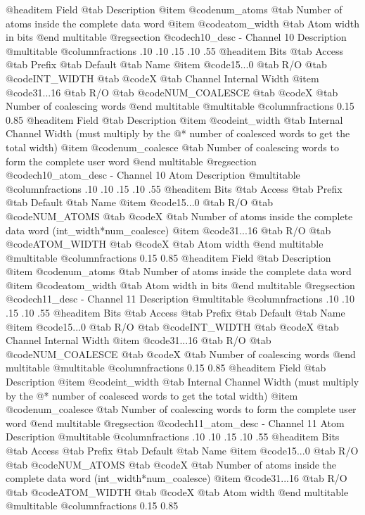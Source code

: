 @headitem Field @tab Description
@item @code{num_atoms} @tab Number of atoms inside the complete data word
@item @code{atom_width} @tab Atom width in bits
@end multitable
@regsection @code{ch10_desc} - Channel 10 Description
@multitable @columnfractions .10 .10 .15 .10 .55
@headitem Bits @tab Access @tab Prefix @tab Default @tab Name
@item @code{15...0}
@tab R/O @tab
@code{INT_WIDTH}
@tab @code{X} @tab 
Channel Internal Width
@item @code{31...16}
@tab R/O @tab
@code{NUM_COALESCE}
@tab @code{X} @tab 
Number of coalescing words
@end multitable
@multitable @columnfractions 0.15 0.85
@headitem Field @tab Description
@item @code{int_width} @tab Internal Channel Width (must multiply by the @* number of coalesced words to get the total width)
@item @code{num_coalesce} @tab Number of coalescing words to form the complete user word
@end multitable
@regsection @code{ch10_atom_desc} - Channel 10 Atom Description
@multitable @columnfractions .10 .10 .15 .10 .55
@headitem Bits @tab Access @tab Prefix @tab Default @tab Name
@item @code{15...0}
@tab R/O @tab
@code{NUM_ATOMS}
@tab @code{X} @tab 
Number of atoms inside the complete data word (int_width*num_coalesce)
@item @code{31...16}
@tab R/O @tab
@code{ATOM_WIDTH}
@tab @code{X} @tab 
Atom width
@end multitable
@multitable @columnfractions 0.15 0.85
@headitem Field @tab Description
@item @code{num_atoms} @tab Number of atoms inside the complete data word
@item @code{atom_width} @tab Atom width in bits
@end multitable
@regsection @code{ch11_desc} - Channel 11 Description
@multitable @columnfractions .10 .10 .15 .10 .55
@headitem Bits @tab Access @tab Prefix @tab Default @tab Name
@item @code{15...0}
@tab R/O @tab
@code{INT_WIDTH}
@tab @code{X} @tab 
Channel Internal Width
@item @code{31...16}
@tab R/O @tab
@code{NUM_COALESCE}
@tab @code{X} @tab 
Number of coalescing words
@end multitable
@multitable @columnfractions 0.15 0.85
@headitem Field @tab Description
@item @code{int_width} @tab Internal Channel Width (must multiply by the @* number of coalesced words to get the total width)
@item @code{num_coalesce} @tab Number of coalescing words to form the complete user word
@end multitable
@regsection @code{ch11_atom_desc} - Channel 11 Atom Description
@multitable @columnfractions .10 .10 .15 .10 .55
@headitem Bits @tab Access @tab Prefix @tab Default @tab Name
@item @code{15...0}
@tab R/O @tab
@code{NUM_ATOMS}
@tab @code{X} @tab 
Number of atoms inside the complete data word (int_width*num_coalesce)
@item @code{31...16}
@tab R/O @tab
@code{ATOM_WIDTH}
@tab @code{X} @tab 
Atom width
@end multitable
@multitable @columnfractions 0.15 0.85
